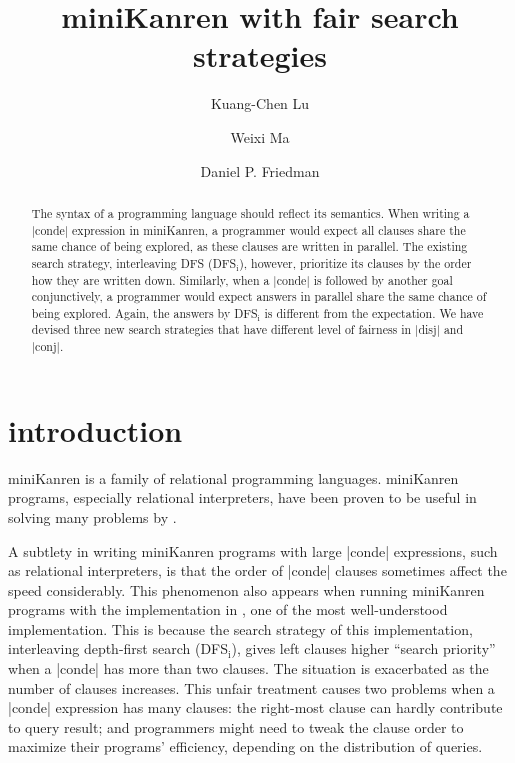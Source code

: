 \documentclass[format=acmlarge, review=true, authordraft=true]{acmart}
\title{miniKanren with fair search strategies}
\author{Kuang-Chen Lu}
\affiliation{Indiana University}
\author{Weixi Ma}
\affiliation{Indiana University}
\author{Daniel P. Friedman}
\affiliation{Indiana University}
\newcommand{\dfsi}[0]{DFS$_\textrm{i}$}
\begin{document}
\begin{abstract}

The syntax of a programming language should reflect its semantics. When writing 
a \scheme|conde| expression in miniKanren, a programmer would expect all clauses 
share the same chance of being explored, as these clauses are written in 
parallel. The existing search strategy, interleaving DFS (DFS$_\textrm{i}$), 
however, prioritize its clauses by the order how they are written down. 
Similarly, when a \scheme|conde| is followed by another goal conjunctively, a 
programmer would expect answers in parallel share the same chance of being 
explored. Again, the answers by DFS$_\textrm{i}$ is different from the 
expectation. We have devised three new search strategies that have different 
level of fairness in \scheme|disj| and \scheme|conj|.

\end{abstract}

\maketitle

\section{introduction}

miniKanren is a family of relational programming languages. miniKanren
programs, especially relational interpreters, have been proven to be
useful in solving many problems by \citet{byrd2017unified}. 

A subtlety in writing miniKanren programs with large \scheme|conde| expressions, 
such as relational interpreters, is that the order of \scheme|conde| clauses 
sometimes affect the speed considerably. This phenomenon also appears when 
running miniKanren programs with the implementation in 
\citet{friedman_reasoned_2018}, one of the most well-understood implementation. 
This is because the search strategy of this implementation, interleaving 
depth-first search (\dfsi), gives left clauses higher ``search priority'' when a 
\scheme|conde| has more than two clauses. The situation is exacerbated as the 
number of clauses increases. This unfair treatment causes two problems when a 
\scheme|conde| expression has many clauses: the right-most clause can hardly 
contribute to query result; and programmers might need to tweak the clause order 
to maximize their programs' efficiency, depending on the distribution of 
queries.
\end{document}
